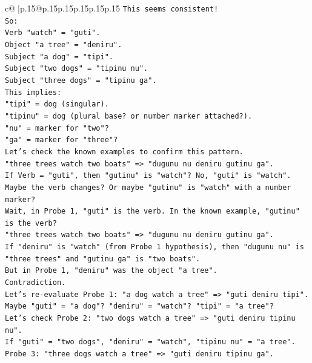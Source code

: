 \documentclass{article}
\begin{document}
{\begin{supertabular}{c@{$\;$}|p{.15\linewidth}@{}p{.15\linewidth}p{.15\linewidth}p{.15\linewidth}p{.15\linewidth}p{.15\linewidth}}
{{{\texttt{This seems consistent!} \\
\texttt{So:} \\
\texttt{Verb "watch" = "guti".} \\
\texttt{Object "a tree" = "deniru".} \\
\texttt{Subject "a dog" = "tipi".} \\
\texttt{Subject "two dogs" = "tipinu nu".} \\
\texttt{Subject "three dogs" = "tipinu ga".} \\
\texttt{This implies:} \\
\texttt{"tipi" = dog (singular).} \\
\texttt{"tipinu" = dog (plural base? or number marker attached?).} \\
\texttt{"nu" = marker for "two"?} \\
\texttt{"ga" = marker for "three"?} \\
\texttt{Let's check the known examples to confirm this pattern.} \\
\texttt{"three trees watch two boats" => "dugunu nu deniru gutinu ga".} \\
\texttt{If Verb = "guti", then "gutinu" is "watch"? No, "guti" is "watch".} \\
\texttt{Maybe the verb changes? Or maybe "gutinu" is "watch" with a number marker?} \\
\texttt{Wait, in Probe 1, "guti" is the verb. In the known example, "gutinu" is the verb?} \\
\texttt{"three trees watch two boats" => "dugunu nu deniru gutinu ga".} \\
\texttt{If "deniru" is "watch" (from Probe 1 hypothesis), then "dugunu nu" is "three trees" and "gutinu ga" is "two boats".} \\
\texttt{But in Probe 1, "deniru" was the object "a tree".} \\
\texttt{Contradiction.} \\
\texttt{Let's re{-}evaluate Probe 1: "a dog watch a tree" => "guti deniru tipi".} \\
\texttt{Maybe "guti" = "a dog"? "deniru" = "watch"? "tipi" = "a tree"?} \\
\texttt{Let's check Probe 2: "two dogs watch a tree" => "guti deniru tipinu nu".} \\
\texttt{If "guti" = "two dogs", "deniru" = "watch", "tipinu nu" = "a tree".} \\
\texttt{Probe 3: "three dogs watch a tree" => "guti deniru tipinu ga".} \\
}}}
\end{supertabular}}
\end{document}
